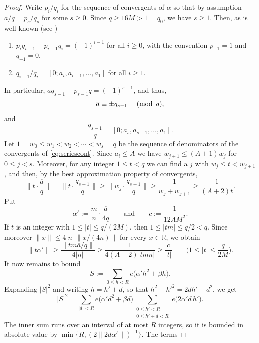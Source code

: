 \documentclass[a4paper,reqno,12pt]{amsart}
\theoremstyle{plain}
\theoremstyle{plain}
\theoremstyle{remark}
\theoremstyle{plain}
\newcommand{\RR}{\mathbb{R}}
\newcommand{\mymod}[1]{{\, \, ({\rm mod} \ \, #1)}}
\theoremstyle{plain}
\theoremstyle{plain}
\begin{document}
{\begin{proof}
Write $p_i / q_i$ for the sequence of convergents of $\alpha$
so that by assumption $a / q = p_s / q_s$ for some $s \geq 0$. Since
$q\geq16M>1=q_0$, we have $s\geq1$.
Then, as is well known (see \cite[Chapter~X]{HW})
\begin{enumerate}
\item $p_i q_{i- 1} - p_{i - 1} q_i = (-1)^{i - 1}$
for all $i \geq 0$, with the convention $p_{-1} = 1$ and $q_{-1} = 0${.}
\item $q_{i - 1} / q_i = [0; a_i, a_{i - 1}, \ldots, a_1]$ for all $i\geq1$.
\end{enumerate}
In particular, $a q_{s - 1} - p_{s - 1} q = (-1)^{s - 1}$, and thus,
$$
\overline{a} \equiv \pm q_{s - 1} \quad \mymod{q},
$$
and
\begin{equation} \label{eq:seriescont}
\frac{q_{s - 1}}{q} = [0;a_{s}, a_{s - 1}, \ldots, a_{1}].
\end{equation}
Let $1 = w_0 \leq w_1 < w_2 < {\cdots} < w_s = q$ be the sequence
of denominators of the convergents of \eqref{eq:seriescont}.
Since $a_i \leq A$ we have $w_{j + 1} \leq (A + 1) w_{j}$ for $0\leq j<s$.
Moreover, for any integer $1 \leq t < q$ we can find a
$j$ with $w_{j} \leq t < w_{j + 1}$, and then, by the best approximation
property of convergents,
$$
\Big \| t \cdot \frac{\overline{a}}{q} \Big \|
= \Big \| t \cdot \frac{q_{s-1}}{q} \Big \|
\geq \Big \| w_j \cdot \frac{q_{s-1}}{q} \Big \|
\geq \frac{1}{w_j + w_{j + 1}} \geq \frac{1}{(A + 2) t}{.}
$$
Put
$$
\alpha':=\frac{m}{n}\cdot\frac{\overline a}{4q}
\qquad\text{and}\qquad
c:=\frac{1}{12AM^2}.
$$
If $t$ is an integer with $1\leq|t|\leq q/(2M)$, then $1\leq|tm|\leq q/2<q$.
Since moreover $\|x\|\leq4|n|\,\|x/(4n)\|$ for every $x\in\RR$, we obtain
\begin{equation} \label{eq:dioph}
\| t\alpha' \| \geq \frac{ \| t m \overline{a} / q \|}{4 |n|} \geq \frac{1}{4 (A + 2) |t m n|} \geq \frac{c}{|t|}
\qquad\Big(1\leq|t|\leq\frac{q}{2M}\Big).
\end{equation}
It now remains to {bound}
\begin{equation} \label{eq:quadraticsum}
S:=\sum_{0 \leq h < R} e \big ( \alpha' h^2 + \beta h \big ).
\end{equation}
Expanding $|S|^2$ and writing $h=h'+d$, so that $h^2-h'^2=2dh'+d^2$, we get
$$
|S|^2=\sum_{|d|<R}e\big(\alpha'd^2+\beta d\big)
\sum_{\substack{0\leq h'<R\\ 0\leq h'+d<R}}e\big(2\alpha'd\,h'\big).
$$
The inner sum runs over an interval of at most $R$ integers, so it is
bounded in absolute value by $\min\{R,(2\|2d\alpha'\|)^{-1}\}$. The terms

\end{proof}}
\end{document}
